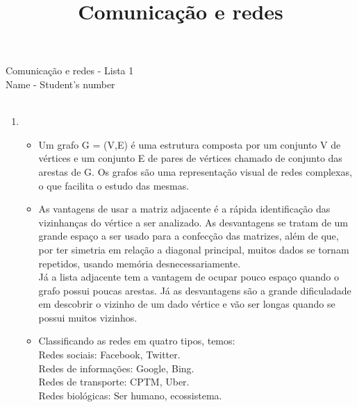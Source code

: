 \documentclass[11pt,reqno]{amsart}
\title{Comunicação e redes}
\author{}
\date{}
\begin{document}
\begin{center}
Comunicação e redes - Lista 1\\ 
Name - Student's number \\ \ \\
\end{center}



\begin{enumerate}

\item

\begin{itemize}
	\item Um grafo G = (V,E) é uma estrutura composta por um conjunto V de vértices e um conjunto E de pares de vértices chamado de 
	conjunto das arestas de G. Os grafos são uma representação visual de redes complexas, o que facilita o estudo das mesmas.
	\item As vantagens de usar a matriz adjacente é a rápida identificação das vizinhanças do vértice a ser analizado. As desvantagens 
	se tratam de um grande espaço a ser usado para a confecção das matrizes, além de que, por ter simetria em relação a diagonal 
	principal, muitos dados se tornam repetidos, usando memória desnecessariamente. \\ Já a lista adjacente tem a vantagem de ocupar 
	pouco espaço quando o grafo possui poucas arestas. Já as desvantagens são a grande dificuladade em descobrir o vizinho de um dado 
	vértice e vão ser longas quando se possui muitos vizinhos.
	\item Classificando as redes em quatro tipos, temos: \\ Redes sociais: Facebook, Twitter. \\ Redes de informações: Google, Bing. \\
	 Redes de transporte: CPTM, Uber. \\ Redes biológicas: Ser humano, ecossistema. 
\end{itemize}
\vspace{0.3cm}



\end{enumerate}
\end{document}
